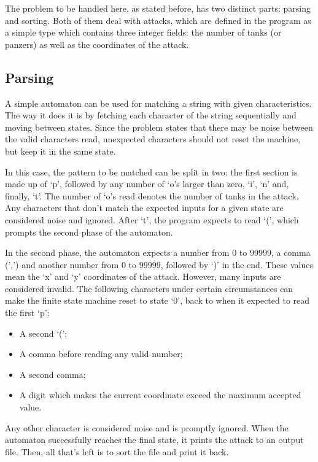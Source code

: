 \documentclass{article}
\begin{document}
The problem to be handled here, as stated before, has two distinct parts: parsing and sorting. Both of them deal with attacks, which are defined in the program as a simple type which contains three integer fields: the number of tanks (or panzers) as well as the coordinates of the attack.

\subsection*{Parsing}

A simple automaton can be used for matching a string with given characteristics. The way it does it is by fetching each character of the string sequentially and moving between states. Since the problem states that there may be noise between the valid characters read, unexpected characters should not reset the machine, but keep it in the same state.

In this case, the pattern to be matched can be split in two: the first section is made up of `p', followed by any number of `o's larger than zero, `i', `n' and, finally, `t'. The number of `o's read denotes the number of tanks in the attack. Any characters that don't match the expected inputs for a given state are considered noise and ignored. After `t', the program expects to read `(', which prompts the second phase of the automaton.

In the second phase, the automaton expects a number from $0$ to $99999$, a comma (',') and another number from $0$ to $99999$, followed by `)' in the end. These values mean the `x' and `y' coordinates of the attack. However, many inputs are considered invalid. The following characters under certain circumstances can make the finite state machine reset to state `0', back to when it expected to read the first `p':

\begin{itemize}
    \item A second `(';
    \item A comma before reading any valid number;
    \item A second comma;
    \item A digit which makes the current coordinate exceed the maximum accepted value.
\end{itemize}

Any other character is considered noise and is promptly ignored. When the automaton successfully reaches the final state, it prints the attack to an output file. Then, all that's left is to sort the file and print it back.
\end{document}
